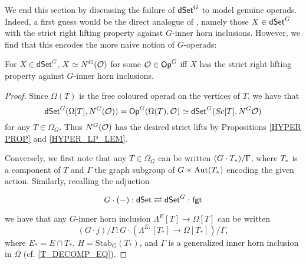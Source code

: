 \documentclass[a4paper,10pt
,draft
]{article}%
\begin{document}
We end this section by discussing the failure of $\mathsf{dSet}^G$ to model genuine operads.
Indeed, a first guess would be the direct analogue of \cite[Prop. 5.3 and Theorem 6.1]{MW09},
namely those $X \in \mathsf{dSet}^G$ with the strict right lifting property against $G$-inner horn inclusions.
However, we find that this encodes the more naive notion of $G$-operads:

\begin{proposition}
      \label{SRLP_OP_PROP}
      For $X \in \mathsf{dSet}^G$,
      $X \simeq N^G(\mathcal{O})$ for some $\mathcal{O} \in \mathsf{Op}^G$  
      iff
      $X$ has the strict right lifting property against $G$-inner horn inclusions.
\end{proposition}
\begin{proof}
      Since $\Omega(T)$ is the free coloured operad on the vertices of $T$, we have that
      \begin{equation}
            \mathsf{dSet}^G(\Omega[T], N^G(\mathcal{O})) = \mathsf{Op}^G(\Omega(T), \mathcal{O}) \simeq \mathsf{dSet}^G(Sc[T], N^G\mathcal{O})
      \end{equation}
      for any $T \in \Omega_G$.
      Thus $N^G(\mathcal{O})$ has the desired strict lifts %
      by Propositions \ref{HYPER PROP} and \ref{HYPER_LP_LEM}.

      Conversely,
      we first note that any $T \in \Omega_G$ can be written $(G \cdot T_{\**})/\Gamma$, where $T_{\**}$ is a component of $T$ and
      $\Gamma$ the graph subgroup of $G \times \mathrm{Aut}(T_{\**})$ encoding the given action.
      Similarly,
      recalling the adjuction
      \begin{equation}
            \begin{tikzcd}
                  G \cdot (-) : \mathsf{dSet}
                  \rightleftarrows
                  \mathsf{dSet}^G : \mathsf{fgt}
            \end{tikzcd}
      \end{equation}
      we have that any $G$-inner horn inclusion
      $\Lambda^{E}[T] \to \Omega[T]$ can be written
      \begin{equation}
            \label{HORN_DECOMP_EQ}
            (G \cdot j)/\Gamma: G \cdot \left(
                  {\Lambda^{E_*}[T_*] \to \Omega[T_*]}
            \right) / \Gamma,
      \end{equation}
      where $E_* = E \cap T_*$, $H = \mathrm{Stab}_G(T_*)$, and
      $\Gamma$ is a generalized inner horn inclusion in $\Omega$ (cf. \eqref{T_DECOMP_EQ}). 
      

\end{proof}
\end{document}
